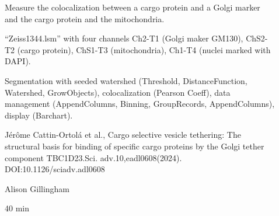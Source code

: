 \pagebreak
{}

\begin{description}
    \item[] Measure the colocalization between a cargo protein and a Golgi marker and the cargo protein and the mitochondria.
    \item[] ``Zeiss1344.lsm'' with four channels Ch2-T1 (Golgi maker GM130), ChS2-T2 (cargo protein), ChS1-T3 (mitochondria), Ch1-T4 (nuclei marked with DAPI).
    \item[] Segmentation with seeded watershed (Threshold, DistanceFunction, Watershed, GrowObjects), colocalization (Pearson Coeff), data management (AppendColumns, Binning, GroupRecords, AppendColumns), display (Barchart).
    \item[] 
        Jérôme Cattin-Ortolá et al., Cargo selective vesicle tethering: The structural basis for binding of specific cargo proteins by the Golgi tether component TBC1D23.Sci. adv.10,eadl0608(2024).
        DOI:10.1126/sciadv.adl0608
    \item[] Alison Gillingham
    \item[] 40 min
    \item[]
\end{description}

